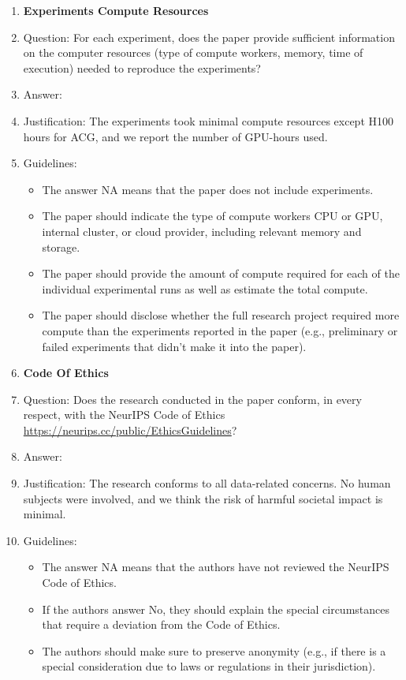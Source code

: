 \documentclass{article}
\begin{document}
\begin{enumerate}
\item {\bf Experiments Compute Resources}
    \item[] Question: For each experiment, does the paper provide sufficient information on the computer resources (type of compute workers, memory, time of execution) needed to reproduce the experiments?
    \item[] Answer: \answerYes{} %
    \item[] Justification: The experiments took minimal compute resources except H100 hours for ACG, and we report the number of GPU-hours used.
    \item[] Guidelines:
    \begin{itemize}
        \item The answer NA means that the paper does not include experiments.
        \item The paper should indicate the type of compute workers CPU or GPU, internal cluster, or cloud provider, including relevant memory and storage.
        \item The paper should provide the amount of compute required for each of the individual experimental runs as well as estimate the total compute. 
        \item The paper should disclose whether the full research project required more compute than the experiments reported in the paper (e.g., preliminary or failed experiments that didn't make it into the paper). 
    \end{itemize}
    
\item {\bf Code Of Ethics}
    \item[] Question: Does the research conducted in the paper conform, in every respect, with the NeurIPS Code of Ethics \url{https://neurips.cc/public/EthicsGuidelines}?
    \item[] Answer: \answerYes{} %
    \item[] Justification: The research conforms to all data-related concerns. No human subjects were involved, and we think the risk of harmful societal impact is minimal.
    \item[] Guidelines:
    \begin{itemize}
        \item The answer NA means that the authors have not reviewed the NeurIPS Code of Ethics.
        \item If the authors answer No, they should explain the special circumstances that require a deviation from the Code of Ethics.
        \item The authors should make sure to preserve anonymity (e.g., if there is a special consideration due to laws or regulations in their jurisdiction).
    \end{itemize}



\end{enumerate}
\end{document}

